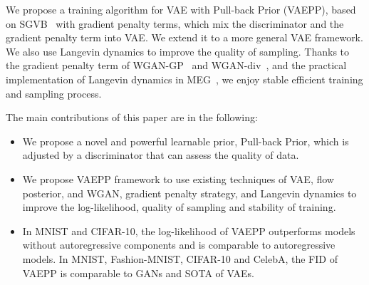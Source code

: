 We propose a training algorithm for VAE with Pull-back Prior (VAEPP), based on SGVB~\cite{kingma2014auto} with gradient penalty terms, which mix the discriminator and the gradient penalty term into VAE. We extend it to a more general VAE framework. We also use Langevin dynamics to improve the quality of sampling. 
Thanks to the gradient penalty term of WGAN-GP~\cite{gulrajani2017improved} and WGAN-div~\cite{wu2018wasserstein}, and the practical implementation of Langevin dynamics in MEG~\cite{kumar2019maximum}, we enjoy stable efficient training and sampling process. 

The main contributions of this paper are in the following:
\begin{itemize}
	\item We propose a novel and powerful learnable prior, Pull-back Prior, which is adjusted by a discriminator that can assess the quality of data. 
	\item We propose VAEPP framework to use existing techniques of VAE, \EG flow posterior, and WGAN, \EG gradient penalty strategy, and Langevin dynamics to improve the log-likelihood, quality of sampling and stability of training. 
	\item In MNIST and CIFAR-10, the log-likelihood of VAEPP outperforms models without autoregressive components and is comparable to autoregressive models. In MNIST, Fashion-MNIST, CIFAR-10 and CelebA,  the FID of VAEPP is comparable to GANs and SOTA of VAEs. 
\end{itemize}
